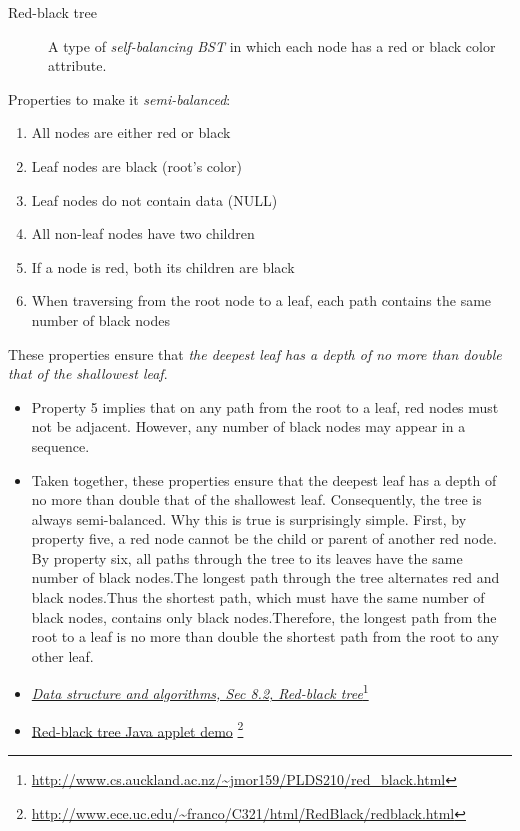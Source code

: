 \begin{frame}
  \begin{description}
  \item[Red-black tree] A type of \emph{self-balancing BST} in which each node has a red
    or black color attribute.
  \end{description}  
  \begin{block}{Properties to make it \emph{semi-balanced}:}
    \begin{enumerate}
    \item All nodes are either red or black
    \item Leaf nodes are black (root's color)
    \item Leaf nodes do not contain data (NULL)
    \item All non-leaf nodes have two children
    \item If a node is red, both its children are black
    \item When traversing from the root node to a leaf, each path contains the same number
      of black nodes
    \end{enumerate}
    These properties ensure that \emph{the deepest leaf has a depth of no more than double that
    of the shallowest leaf}.
  \end{block}
\end{frame}

\begin{itemize}
\item Property 5 implies that on any path from the root to a leaf, red nodes must not be
  adjacent.  However, any number of black nodes may appear in a sequence.
\item Taken together, these properties ensure that the deepest leaf has a depth of no more
  than double that of the shallowest leaf. Consequently, the tree is always
  semi-balanced. Why this is true is surprisingly simple. First, by property five, a red
  node cannot be the child or parent of another red node. By property six, all paths
  through the tree to its leaves have the same number of black nodes.The longest path
  through the tree alternates red and black nodes.Thus the shortest path, which must have
  the same number of black nodes, contains only black nodes.Therefore, the longest path
  from the root to a leaf is no more than double the shortest path from the root to any
  other leaf. 
\item \href{http://www.cs.auckland.ac.nz/\char`~jmor159/PLDS210/red\_black.html}{\emph{Data
      structure and algorithms, Sec 8.2, Red-black
      tree}}\footnote{\url{http://www.cs.auckland.ac.nz/~jmor159/PLDS210/red_black.html}}
\item \href{http://www.ece.uc.edu/\char`~franco/C321/html/RedBlack/redblack.html}{Red-black tree
    Java applet demo}
  \footnote{\url{http://www.ece.uc.edu/~franco/C321/html/RedBlack/redblack.html}}
\end{itemize}

